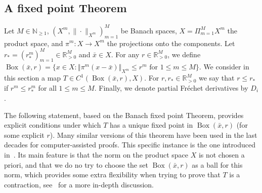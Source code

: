 \documentclass[10pt,a4paper]{article}
\theoremstyle{plain}
\newcommand{\RR}{\mathbb R}
\newcommand{\NN}{\mathbb N}
\newcommand{\1}{\mathbf{1}}
\newcommand{\rstar}{r_*}
\DeclareMathOperator{\bbox}{Box}
\begin{document}
\subsection{A fixed point Theorem}
\label{sec:NewtonKantorovich}


Let $M\in\NN_{\geq 1}$, $(X^m,\|\cdot\|_{X^m})_{m=1}^M$ be Banach spaces, $X=\Pi_{m=1}^M X^m$ the product space, and $\pi^m:X\to X^m$ the projections onto the components. Let $\rstar = (\rstar^m)_{m=1}^M \in \RR_{>0}^M$ and $\bar{x} \in X$. For any $r\in \RR_{>0}^M$, we define $\bbox(\bar{x},r) = \{ x \in X :  \left\Vert\pi^{m}(x-\bar{x}) \right\Vert_{X^m} \leq r^m \text{ for } 1\leq m\leq M\}$. We consider in this section a map $T \in C^1(\bbox(\bar{x},r),X)$. For $r,\rstar \in \RR_{>0}^M$ we say that $r \leq \rstar$ if $r^m \leq \rstar^m$ for all $1\leq m\leq M$. Finally, we denote partial Fr\'echet derivatives by $D_i$. 

The following statement, based on the Banach fixed point Theorem, provides explicit conditions under which $T$ has a unique fixed point in $\bbox(\bar{x},r)$ (for some explicit $r$). Many similar versions of this theorem have been used in the last decades for computer-assisted proofs. This specific instance is the one introduced in~\cite[Theorem 2.12]{BerBreShe24}. Its main feature is that the norm on the product space $X$ is not chosen a priori, and that we do no try to choose the set $\bbox(\bar{x},r)$ as a ball for this norm, which provides some extra flexibility when trying to prove that $T$ is a contraction, see~\cite{BerBreShe24} for a more in-depth discussion.
\end{document}
